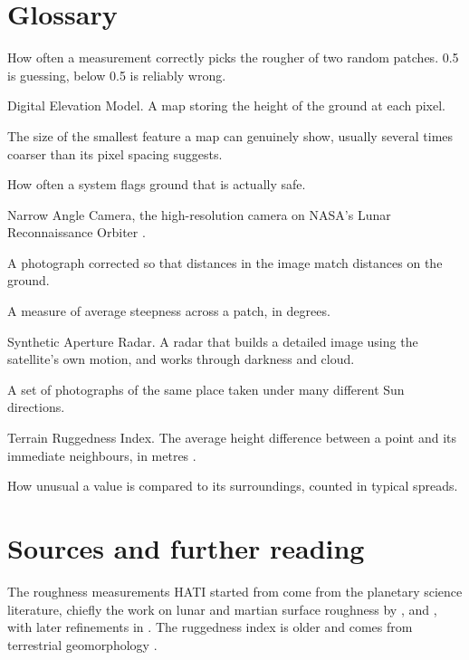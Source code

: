 \documentclass[11pt]{article}
\begin{document}
\section{Glossary}

\begin{description}[leftmargin=!,labelwidth=3.1cm,style=nextline]
\item[AUC] How often a measurement correctly picks the rougher of two random patches.
\num{0.5} is guessing, below \num{0.5} is reliably wrong.
\item[DEM] Digital Elevation Model. A map storing the height of the ground at each pixel.
\item[Effective resolution] The size of the smallest feature a map can genuinely show,
usually several times coarser than its pixel spacing suggests.
\item[False alarm rate] How often a system flags ground that is actually safe.
\item[NAC] Narrow Angle Camera, the high-resolution camera on NASA's Lunar
Reconnaissance Orbiter \autocite{robinson2010}.
\item[Orthophoto] A photograph corrected so that distances in the image match
distances on the ground.
\item[RMS slope] A measure of average steepness across a patch, in degrees.
\item[SAR] Synthetic Aperture Radar. A radar that builds a detailed image using the
satellite's own motion, and works through darkness and cloud.
\item[Solar sweep] A set of photographs of the same place taken under many different
Sun directions.
\item[TRI] Terrain Ruggedness Index. The average height difference between a point and
its immediate neighbours, in metres \autocite{riley1999}.
\item[z-score] How unusual a value is compared to its surroundings, counted in typical
spreads.
\end{description}

\section{Sources and further reading}

The roughness measurements HATI started from come from the planetary science
literature, chiefly the work on lunar and martian surface roughness by
\textcite{kreslavsky2000}, \textcite{rosenburg2011} and \textcite{kreslavsky2013}, with
later refinements in \textcite{caifa2020}. The ruggedness index is older and comes from
terrestrial geomorphology \autocite{riley1999}.
\end{document}
